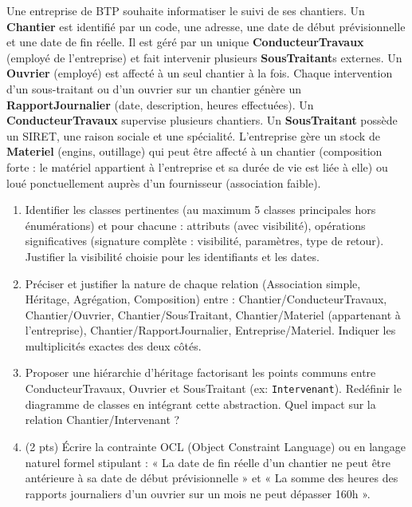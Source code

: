 \documentclass[11pt]{article}
\begin{document}
\begin{exercice}
Une entreprise de BTP souhaite informatiser le suivi de ses chantiers. Un \textbf{Chantier} est identifié par un code, une adresse, une date de début prévisionnelle et une date de fin réelle. Il est géré par un unique \textbf{ConducteurTravaux} (employé de l'entreprise) et fait intervenir plusieurs \textbf{SousTraitant}s externes. Un \textbf{Ouvrier} (employé) est affecté à un seul chantier à la fois. Chaque intervention d'un sous-traitant ou d'un ouvrier sur un chantier génère un \textbf{RapportJournalier} (date, description, heures effectuées). Un \textbf{ConducteurTravaux} supervise plusieurs chantiers. Un \textbf{SousTraitant} possède un SIRET, une raison sociale et une spécialité. L'entreprise gère un stock de \textbf{Materiel} (engins, outillage) qui peut être affecté à un chantier (composition forte : le matériel appartient à l'entreprise et sa durée de vie est liée à elle) ou loué ponctuellement auprès d'un fournisseur (association faible).
\begin{enumerate}
    \item Identifier les classes pertinentes (au maximum 5 classes principales hors énumérations) et pour chacune : attributs (avec visibilité), opérations significatives (signature complète : visibilité, paramètres, type de retour). Justifier la visibilité choisie pour les identifiants et les dates.
    \item Préciser et justifier la nature de chaque relation (Association simple, Héritage, Agrégation, Composition) entre : Chantier/ConducteurTravaux, Chantier/Ouvrier, Chantier/SousTraitant, Chantier/Materiel (appartenant à l'entreprise), Chantier/RapportJournalier, Entreprise/Materiel. Indiquer les multiplicités exactes des deux côtés.
    \item Proposer une hiérarchie d'héritage factorisant les points communs entre ConducteurTravaux, Ouvrier et SousTraitant (ex: \texttt{Intervenant}). Redéfinir le diagramme de classes en intégrant cette abstraction. Quel impact sur la relation Chantier/Intervenant ?
    \item (2 pts) Écrire la contrainte OCL (Object Constraint Language) ou en langage naturel formel stipulant : « La date de fin réelle d'un chantier ne peut être antérieure à sa date de début prévisionnelle » et « La somme des heures des rapports journaliers d'un ouvrier sur un mois ne peut dépasser 160h ».
\end{enumerate}
\end{exercice}
\end{document}

